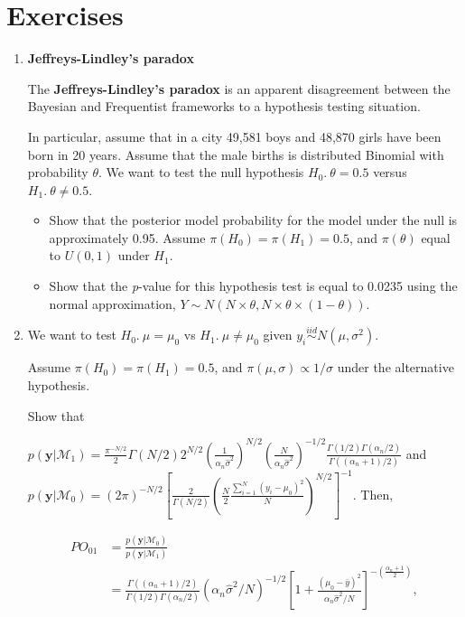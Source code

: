 \section{Exercises}\label{sec28}
\begin{enumerate}
\item \textbf{Jeffreys-Lindley's paradox}

The \textbf{Jeffreys-Lindley's paradox} \cite{Jeffreys1961,lindley1957statistical} is an apparent disagreement between the Bayesian and Frequentist frameworks to a hypothesis testing situation.

In particular, assume that in a city 49,581 boys and 48,870 girls have been born in 20 years. Assume that the male births is distributed Binomial with probability $\theta$. We want to test the null hypothesis $H_0. \ \theta=0.5$ versus $H_1. \ \theta\neq 0.5$.

\begin{itemize}
	\item Show that the posterior model probability for the model under the null is approximately 0.95. Assume $\pi(H_0)=\pi(H_1)=0.5$, and $\pi(\theta)$ equal to ${U}(0,1)$ under $H_1$.
	\item Show that the \textit{p}-value for this hypothesis test is equal to 0.0235 using the normal approximation, $Y\sim {N}(N\times \theta, N\times \theta \times (1-\theta))$. 
\end{itemize}

\item We want to test $H_0. \ \mu=\mu_0$ vs $H_1. \ \mu \neq \mu_0$ given $y_i\stackrel{iid}{\sim}N(\mu,\sigma^2)$.

Assume $\pi(H_0)=\pi(H_1)=0.5$, and $\pi(\mu,\sigma)\propto 1/\sigma$ under the alternative hypothesis.

Show that

$p(\mathbf{y}|\mathcal{M}_1)=\frac{\pi^{-N/2}}{2}\Gamma(N/2)2^{N/2}\left(\frac{1}{\alpha_n\hat{\sigma}^2}\right)^{N/2}\left(\frac{N}{\alpha_n\hat{\sigma}^2}\right)^{-1/2}\frac{\Gamma(1/2)\Gamma(\alpha_n/2)}{\Gamma((\alpha_n+1)/2)}$ and $p(\mathbf{y}|\mathcal{M}_0)=(2\pi)^{-N/2}\left[\frac{2}{\Gamma(N/2)}\left(\frac{N}{2}\frac{\sum_{i=1}^N(y_i-\mu_0)^2}{N}\right)^{N/2}\right]^{-1}$. Then,

\begin{align*}
	PO_{01}&=\frac{p(\mathbf{y}|\mathcal{M}_0)}{p(\mathbf{y}|\mathcal{M}_1)}\\
	& =\frac{\Gamma((\alpha_n+1)/2)}{\Gamma(1/2)\Gamma(\alpha_n/2)}(\alpha_n\hat{\sigma}^2/N)^{-1/2}\left[1+\frac{(\mu_0-\bar{y})^2}{\alpha_n\hat{\sigma}^2/N}\right]^{-\left(\frac{\alpha_n+1}{2}\right)},
\end{align*}


\end{enumerate}
